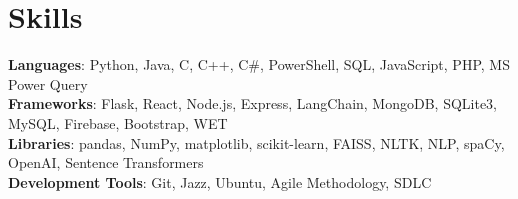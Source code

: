 \documentclass[letterpaper,11pt]{article}
\begin{document}
\section{\textbf{\Large Skills}}
  \begin{itemize}[leftmargin=0.15in, label={}]
    \small{
    \item{
    \textbf{Languages}{: Python, Java, C, C++, C\#, PowerShell, SQL, JavaScript, PHP, MS Power Query} \\[0.25em]
    \textbf{Frameworks}{: Flask, React, Node.js, Express, LangChain, MongoDB, SQLite3, MySQL, Firebase, Bootstrap, WET} \\[0.25em]
    \textbf{Libraries}{: pandas, NumPy, matplotlib, scikit-learn, FAISS, NLTK, NLP, spaCy, OpenAI, Sentence Transformers} \\[0.25em]
    \textbf{Development Tools}{: Git, Jazz, Ubuntu, Agile Methodology, SDLC} \\
    }}
  \end{itemize}







\end{document}
